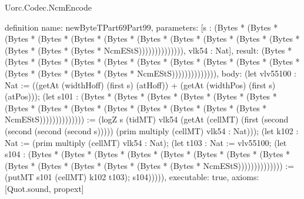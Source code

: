 \begin{lexlean}{Uorc.Codec.NcmEncode}
\begin{semanticmodule}
definition{
  name: newByteTPart69Part99,
  parameters: [s : (Bytes * (Bytes * (Bytes * (Bytes * (Bytes * (Bytes * (Bytes * (Bytes * (Bytes * (Bytes * (Bytes * (Bytes * (Bytes * (Bytes * NcmEStS)))))))))))))), vlk54 : Nat],
  result: (Bytes * (Bytes * (Bytes * (Bytes * (Bytes * (Bytes * (Bytes * (Bytes * (Bytes * (Bytes * (Bytes * (Bytes * (Bytes * (Bytes * NcmEStS)))))))))))))),
  body: (let vlv55100 : Nat := ((getAt (widthHoff) (first s) (atHoff)) + (getAt (widthPos) (first s) (atPos))); (let s101 : (Bytes * (Bytes * (Bytes * (Bytes * (Bytes * (Bytes * (Bytes * (Bytes * (Bytes * (Bytes * (Bytes * (Bytes * (Bytes * (Bytes * NcmEStS)))))))))))))) := (logZ s (tidMT) vlk54 (getAt (cellMT) (first (second (second (second (second s))))) (prim multiply (cellMT) vlk54 : Nat))); (let k102 : Nat := (prim multiply (cellMT) vlk54 : Nat); (let t103 : Nat := vlv55100; (let s104 : (Bytes * (Bytes * (Bytes * (Bytes * (Bytes * (Bytes * (Bytes * (Bytes * (Bytes * (Bytes * (Bytes * (Bytes * (Bytes * (Bytes * NcmEStS)))))))))))))) := (putMT s101 (cellMT) k102 t103); s104))))),
  executable: true,
  axioms: [Quot.sound, propext]
}


\end{semanticmodule}
\end{lexlean}
